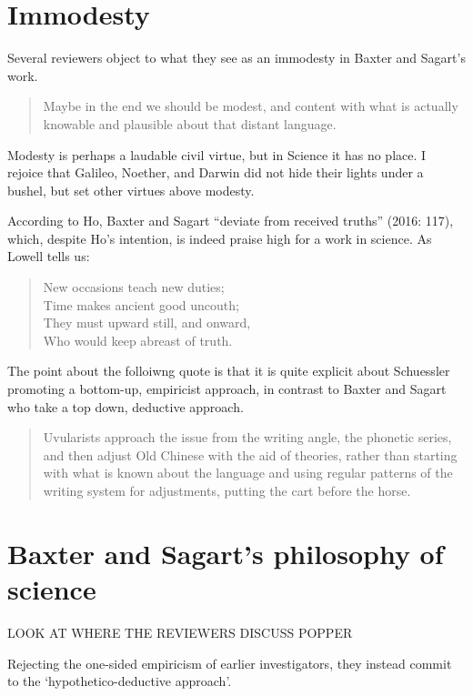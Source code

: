 \section{Immodesty}
Several reviewers object to what they see as an immodesty in Baxter and Sagart's work. 

\begin{quote}
Maybe in the end we should be modest, and
content with what is actually knowable and plausible about that distant language.    \citep[596]{Schuessler2015BSrv}
\end{quote}

\noindent Modesty is perhaps a laudable civil virtue, but in Science it has no place. 
I rejoice that Galileo, Noether, and Darwin did not hide their lights under a bushel, but set other virtues above modesty.

According to Ho, Baxter and Sagart 
``deviate from received truths'' 
(2016: 117), which, despite Ho's intention, is indeed praise high for a work in science. As Lowell tells us: 

\begin{verse}
New occasions teach new duties; \\
Time makes ancient good uncouth; \\
They must upward still, and onward, \\
Who would keep abreast of truth.
\end{verse}

The point about the folloiwng quote is that it is quite explicit about Schuessler promoting a bottom-up, empiricist approach, in contrast to Baxter and Sagart who take a top down, deductive approach. 
    
\begin{quote}
Uvularists approach the issue from the writing angle, the phonetic series, and then adjust Old Chinese with the aid of theories, rather than starting with what is known about the language and using regular patterns of the writing system for adjustments, putting the cart before the horse.     \citep[PAGE]{Schuessler2015BSrv}

\end{quote}


\section{Baxter and Sagart's philosophy of science}
\label{sec:BnS-philo-sci}
LOOK AT WHERE THE REVIEWERS DISCUSS POPPER


Rejecting the one-sided empiricism of earlier investigators, they instead commit to the `hypothetico-deductive approach'. 


